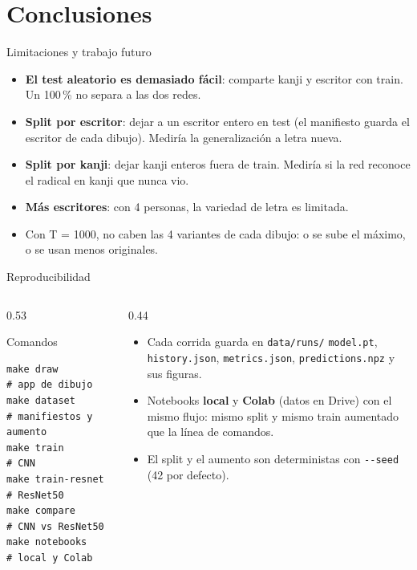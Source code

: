 \documentclass[aspectratio=169,11pt]{beamer}
\begin{document}
\section{Conclusiones}

\begin{frame}{Limitaciones y trabajo futuro}
  \begin{itemize}
    \item \textbf{El test aleatorio es demasiado fácil}: comparte kanji y escritor con train. Un 100\,\% no separa a las dos redes.
    \item \textbf{Split por escritor}: dejar a un escritor entero en test (el manifiesto guarda el escritor de cada dibujo). Mediría la generalización a letra nueva.
    \item \textbf{Split por kanji}: dejar kanji enteros fuera de train. Mediría si la red reconoce el radical en kanji que nunca vio.
    \item \textbf{Más escritores}: con 4 personas, la variedad de letra es limitada.
    \item Con T = 1000, no caben las 4 variantes de cada dibujo: o se sube el máximo, o se usan menos originales.
  \end{itemize}
\end{frame}

\begin{frame}[fragile]{Reproducibilidad}
  \begin{columns}[T]
    \begin{column}{0.53\textwidth}
      \begin{block}{Comandos}
\footnotesize
\begin{verbatim}
make draw          # app de dibujo
make dataset       # manifiestos y aumento
make train         # CNN
make train-resnet  # ResNet50
make compare       # CNN vs ResNet50
make notebooks     # local y Colab
\end{verbatim}
      \end{block}
    \end{column}
    \begin{column}{0.44\textwidth}
      \small
      \begin{itemize}
        \item Cada corrida guarda en \texttt{data/runs/} \texttt{model.pt}, \texttt{history.json}, \texttt{metrics.json}, \texttt{predictions.npz} y sus figuras.
        \item Notebooks \textbf{local} y \textbf{Colab} (datos en Drive) con el mismo flujo: mismo split y mismo train aumentado que la línea de comandos.
        \item El split y el aumento son deterministas con \texttt{-{}-seed} (42 por defecto).
      \end{itemize}
    \end{column}
  \end{columns}
\end{frame}
\end{document}
